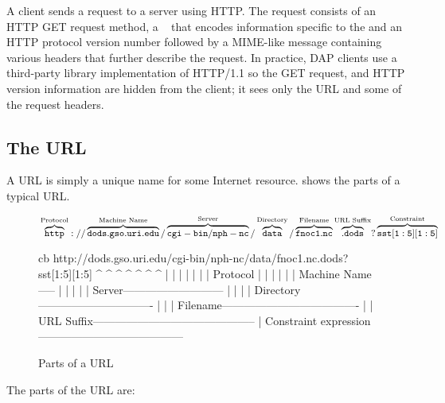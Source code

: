 \documentclass[justify]{dods-paper}
\begin{document}
A \DAP client sends a request to a server using HTTP. The request
consists of an HTTP GET request method, a \URI~\cite{rfc2396} that
encodes information specific to the \DAP and an HTTP protocol version
number followed by a MIME-like message containing various headers that
further describe the request. In practice, DAP clients use a
third-party library implementation of HTTP/1.1 so the GET request,
\URI and HTTP version information are hidden from the client; it sees
only the \DAP URL and some of the request headers.

\subsection{The URL}
\label{sec-url}

A URL is simply a unique name for some Internet resource.
 shows the parts of a typical \DAP URL.

\begin{figure}[h]
\texorhtml
{\begin{center}\small
${}\overbrace{\tt http}^{\textnormal{Protocol}}://
\overbrace{\tt dods.gso.uri.edu}^{\textnormal{Machine Name}}/
\overbrace{\tt cgi-bin/nph-nc}^{\textnormal{Server}}/
\overbrace{\tt data}^{\textnormal{Directory}}/
\overbrace{\tt fnoc1.nc}^{\textnormal{Filename}}
\overbrace{\tt .dods}^{\textnormal{URL Suffix}}?
\overbrace{\tt sst[1:5][1:5]}^{\textnormal{Constraint}}$
\end{center}}
{\begin{vcode}{cb}
http://dods.gso.uri.edu/cgi-bin/nph-nc/data/fnoc1.nc.dods?sst[1:5][1:5]
   ^            ^               ^      ^    ^        ^     ^
   |            |               |      |    |        |     |
Protocol        |               |      |    |        |     |
Machine Name-----               |      |    |        |     |
Server---------------------------      |    |        |     |
Directory-------------------------------    |        |     |
Filename-------------------------------------        |     |
URL Suffix--------------------------------------------     |
Constraint expression---------------------------------------
\end{vcode}}
\caption{Parts of a \DAP URL}
\label{fig-url-parts}
\end{figure}

The parts of the URL are:
\end{document}
